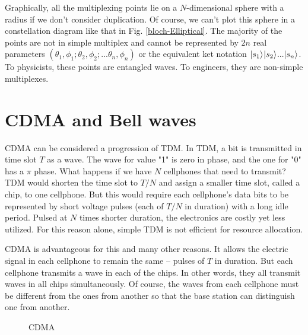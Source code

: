 \documentclass[oneside, letter, 12pt]{book}
\begin{document}
Graphically, all the multiplexing points lie on a $N$-dimensional sphere with a radius if we don't consider duplication. Of course, we can't plot this sphere in a constellation diagram like that in Fig. \ref{bloch-Elliptical}. The majority of the points are not in simple multiplex and cannot be represented by $2n$ real parameters $(\theta_1, \phi_1; \theta_2, \phi_2; ... \theta_n, \phi_n)$ or the equivalent ket notation $\vert {s_1} \rangle_{} \vert {s_2} \rangle_{} ... \vert {s_n} \rangle_{}$. To physicists, these points are entangled waves. To engineers, they are non-simple multiplexes.

\section{CDMA and Bell waves}
CDMA can be considered a progression of TDM. In TDM, a bit is transmitted in time slot $T$ as a wave. The wave for value "1" is zero in phase, and the one for "0" has a $\pi$ phase. What happens if we have $N$ cellphones that need to transmit? TDM would shorten the time slot to $T/N$ and assign a smaller time slot, called a chip, to one cellphone. But this would require each cellphone's data bits to be represented by short voltage pulses (each of $T/N$ in duration) with a long idle period. Pulsed at $N$ times shorter duration, the electronics are costly yet less utilized. For this reason alone, simple TDM is not efficient for resource allocation.

CDMA is advantageous for this and many other reasons. It allows the electric signal in each cellphone to remain the same -- pulses of $T$ in duration. But each cellphone transmits a wave in each of the chips. In other words, they all transmit waves in all chips simultaneously. Of course, the waves from each cellphone must be different from the ones from another so that the base station can distinguish one from another.
\begin{figure}
    \centering
\label{2CDMA}
    \caption{CDMA}
\end{figure}
\end{document}

